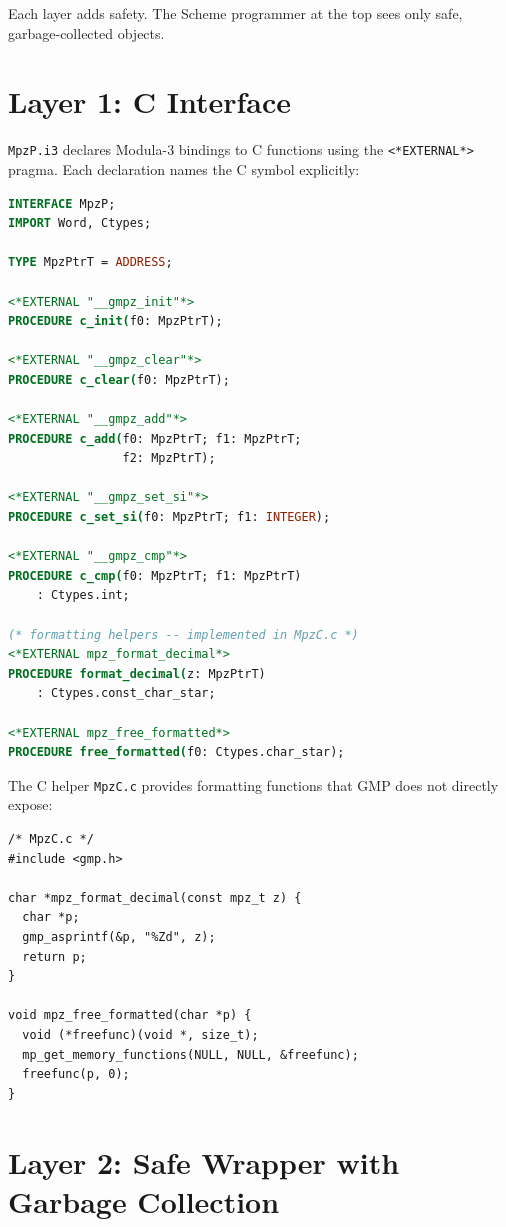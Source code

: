 \documentclass[12pt]{report}
\begin{document}
\noindent Each layer adds safety.  The Scheme programmer at the top
sees only safe, garbage-collected objects.

\section{Layer 1: C Interface}

{\tt MpzP.i3} declares Modula-3 bindings to C functions using the
{\tt <*EXTERNAL*>} pragma.  Each declaration names the C symbol
explicitly:

\begin{lstlisting}[language=Modula3]
INTERFACE MpzP;
IMPORT Word, Ctypes;

TYPE MpzPtrT = ADDRESS;

<*EXTERNAL "__gmpz_init"*>
PROCEDURE c_init(f0: MpzPtrT);

<*EXTERNAL "__gmpz_clear"*>
PROCEDURE c_clear(f0: MpzPtrT);

<*EXTERNAL "__gmpz_add"*>
PROCEDURE c_add(f0: MpzPtrT; f1: MpzPtrT;
                f2: MpzPtrT);

<*EXTERNAL "__gmpz_set_si"*>
PROCEDURE c_set_si(f0: MpzPtrT; f1: INTEGER);

<*EXTERNAL "__gmpz_cmp"*>
PROCEDURE c_cmp(f0: MpzPtrT; f1: MpzPtrT)
    : Ctypes.int;

(* formatting helpers -- implemented in MpzC.c *)
<*EXTERNAL mpz_format_decimal*>
PROCEDURE format_decimal(z: MpzPtrT)
    : Ctypes.const_char_star;

<*EXTERNAL mpz_free_formatted*>
PROCEDURE free_formatted(f0: Ctypes.char_star);
\end{lstlisting}

\noindent The C helper {\tt MpzC.c} provides formatting functions
that GMP does not directly expose:

\begin{lstlisting}[language={}]
/* MpzC.c */
#include <gmp.h>

char *mpz_format_decimal(const mpz_t z) {
  char *p;
  gmp_asprintf(&p, "%Zd", z);
  return p;
}

void mpz_free_formatted(char *p) {
  void (*freefunc)(void *, size_t);
  mp_get_memory_functions(NULL, NULL, &freefunc);
  freefunc(p, 0);
}
\end{lstlisting}

\section{Layer 2: Safe Wrapper with Garbage Collection}
\end{document}
